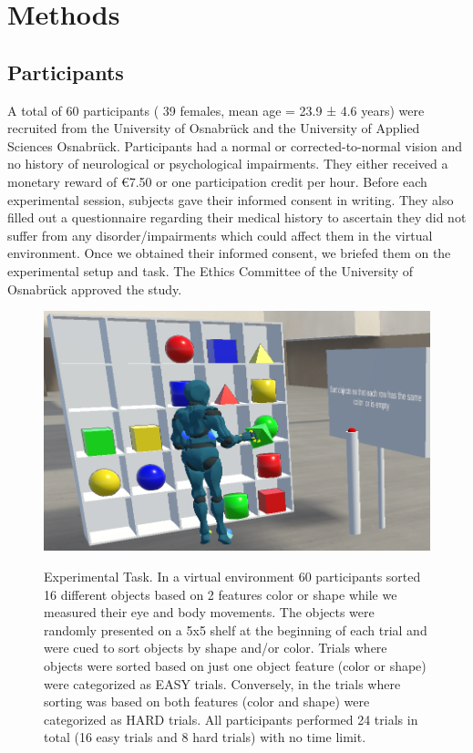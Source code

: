\section{Methods}
\subsection{Participants}
A total of 60 participants ( 39 females, mean age = 23.9 ± 4.6 years) were recruited from the University of Osnabrück and the University of Applied Sciences Osnabr{\"u}ck. Participants had a normal or corrected-to-normal vision and no history of neurological or psychological impairments. They either received a monetary reward of €7.50 or one participation credit per hour. Before each experimental session, subjects gave their informed consent in writing. They also filled out a questionnaire regarding their medical history to ascertain they did not suffer from any disorder/impairments which could affect them in the virtual environment. Once we obtained their informed consent, we briefed them on the experimental setup and task. The Ethics Committee of the University of Osnabr{\"u}ck approved the study. 

\begin{figure}[H]
    \centering
    \includegraphics[width=0.7\linewidth]{source/figures/experiment_setup/task.jpg} \\
    \caption[]{Experimental Task. In a virtual environment 60 participants sorted 16 different objects based on 2 features color or shape while we measured their eye and body movements. The objects were randomly presented on a 5x5 shelf at the beginning of each trial and were cued to sort objects by shape and/or color. Trials where objects were sorted based on just one object feature (color or shape) were categorized as EASY trials. Conversely, in the trials where sorting was based on both features (color and shape) were categorized as HARD trials. All participants performed 24 trials in total (16 easy trials and 8 hard trials) with no time limit.}
    \label{figure:task}
\end{figure}

